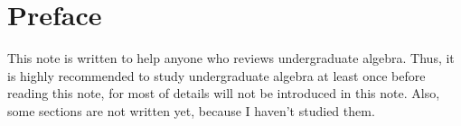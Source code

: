 \chapter*{Preface}

This note is written to help anyone who reviews undergraduate algebra.
Thus, it is highly recommended to study undergraduate algebra at least once before reading this note, for most of details will not be introduced in this note.
Also, some sections are not written yet, because I haven't studied them.